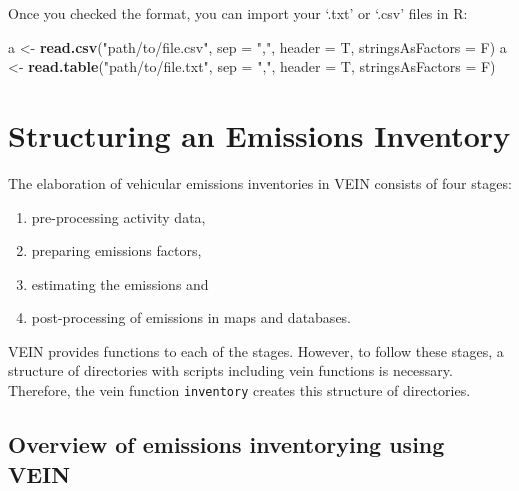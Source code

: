 \documentclass[12pt,graybox,envcountchap,sectrefs]{krantz}
\makeatletter
\newenvironment{Shaded}{\begin{snugshade}}{\end{snugshade}}
\newcommand{\KeywordTok}[1]{\textcolor[rgb]{0.13,0.29,0.53}{\textbf{#1}}}
\newcommand{\DataTypeTok}[1]{\textcolor[rgb]{0.13,0.29,0.53}{#1}}
\newcommand{\StringTok}[1]{\textcolor[rgb]{0.31,0.60,0.02}{#1}}
\newcommand{\NormalTok}[1]{#1}
\providecommand{\tightlist}{%
  \setlength{\itemsep}{0pt}\setlength{\parskip}{0pt}}
\newenvironment{kframe}{%
\medskip{}
\setlength{\fboxsep}{.8em}
 \def\at@end@of@kframe{}%
 \ifinner\ifhmode%
  \def\at@end@of@kframe{\end{minipage}}%
  \begin{minipage}{\columnwidth}%
 \fi\fi%
 \def\FrameCommand##1{\hskip\@totalleftmargin \hskip-\fboxsep
 \colorbox{shadecolor}{##1}\hskip-\fboxsep
     \hskip-\linewidth \hskip-\@totalleftmargin \hskip\columnwidth}%
 \MakeFramed {\advance\hsize-\width
   \@totalleftmargin\z@ \linewidth\hsize
   \@setminipage}}%
 {\par\unskip\endMakeFramed%
 \at@end@of@kframe}
\renewenvironment{Shaded}{\begin{kframe}}{\end{kframe}}
\theoremstyle{definition}
\theoremstyle{definition}
\theoremstyle{definition}
\theoremstyle{remark}
\makeatother
\begin{document}
Once you checked the format, you can import your `.txt' or `.csv' files
in R:

\begin{Shaded}
\begin{Highlighting}[]
\NormalTok{a <-}\StringTok{ }\KeywordTok{read.csv}\NormalTok{(}\StringTok{"path/to/file.csv"}\NormalTok{, }\DataTypeTok{sep =} \StringTok{","}\NormalTok{,}
              \DataTypeTok{header =}\NormalTok{ T, }\DataTypeTok{stringsAsFactors =}\NormalTok{ F)}
\NormalTok{a <-}\StringTok{ }\KeywordTok{read.table}\NormalTok{(}\StringTok{"path/to/file.txt"}\NormalTok{, }\DataTypeTok{sep =} \StringTok{","}\NormalTok{,}
                \DataTypeTok{header =}\NormalTok{ T, }\DataTypeTok{stringsAsFactors =}\NormalTok{ F)}
\end{Highlighting}
\end{Shaded}

\chapter{Structuring an Emissions Inventory}\label{st}

The elaboration of vehicular emissions inventories in VEIN consists of
four stages:

\begin{enumerate}
\def\labelenumi{\arabic{enumi}.}
\tightlist
\item
  pre-processing activity data,
\item
  preparing emissions factors,
\item
  estimating the emissions and
\item
  post-processing of emissions in maps and databases.
\end{enumerate}

VEIN provides functions to each of the stages. However, to follow these
stages, a structure of directories with scripts including vein functions
is necessary. Therefore, the vein function \texttt{inventory} creates
this structure of directories.

\section{Overview of emissions inventorying using
VEIN}\label{veinstructure}
\end{document}
